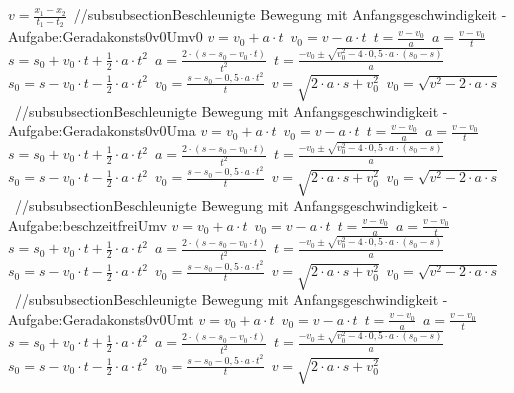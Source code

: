 $ v = \frac{x_{1}  - x_{2} }{t_{1}  - t_{2} } $\ 
//subsubsection{Beschleunigte Bewegung mit Anfangsgeschwindigkeit - Aufgabe:Geradakonsts0v0Umv0} 
$ v = v_{0}  + a\cdot t $\ 
$ v_{0}  = v - a\cdot t $\ 
$ t = \frac{v - v_{0} }{a} $\ 
$ a = \frac{v - v_{0} }{  t} $\ 
$ s = s_{0}  + v_{0} \cdot t + \frac{1}{2}\cdot a\cdot t^{2} $\ 
$ a = \frac{2\cdot (s - s_{0}  - v_{0} \cdot t)}{     t^{2} } $\ 
$ t = \frac{-v_{0}  \pm \sqrt{v_{0} ^{2} -4\cdot 0,5\cdot a\cdot (s_{0}  -s)}}{       a} $\ 
$ s_{0}  = s - v_{0} \cdot t - \frac{1}{2}\cdot a\cdot t^{2} $\ 
$ v_{0}  =\frac{s-s_{0} -0,5\cdot a\cdot t^{2} }{    t} $\ 
$ v  =\sqrt{2\cdot a \cdot s+ v_{0}^2} $\ 
$ v_{0}  =\sqrt{v^2-2\cdot a \cdot s} $\ 
//subsubsection{Beschleunigte Bewegung mit Anfangsgeschwindigkeit - Aufgabe:Geradakonsts0v0Uma} 
$ v = v_{0}  + a\cdot t $\ 
$ v_{0}  = v - a\cdot t $\ 
$ t = \frac{v - v_{0} }{a} $\ 
$ a = \frac{v - v_{0} }{  t} $\ 
$ s = s_{0}  + v_{0} \cdot t + \frac{1}{2}\cdot a\cdot t^{2} $\ 
$ a = \frac{2\cdot (s - s_{0}  - v_{0} \cdot t)}{     t^{2} } $\ 
$ t = \frac{-v_{0}  \pm \sqrt{v_{0} ^{2} -4\cdot 0,5\cdot a\cdot (s_{0}  -s)}}{       a} $\ 
$ s_{0}  = s - v_{0} \cdot t - \frac{1}{2}\cdot a\cdot t^{2} $\ 
$ v_{0}  =\frac{s-s_{0} -0,5\cdot a\cdot t^{2} }{    t} $\ 
$ v  =\sqrt{2\cdot a \cdot s+ v_{0}^2} $\ 
$ v_{0}  =\sqrt{v^2-2\cdot a \cdot s} $\ 
//subsubsection{Beschleunigte Bewegung mit Anfangsgeschwindigkeit - Aufgabe:beschzeitfreiUmv} 
$ v = v_{0}  + a\cdot t $\ 
$ v_{0}  = v - a\cdot t $\ 
$ t = \frac{v - v_{0} }{a} $\ 
$ a = \frac{v - v_{0} }{  t} $\ 
$ s = s_{0}  + v_{0} \cdot t + \frac{1}{2}\cdot a\cdot t^{2} $\ 
$ a = \frac{2\cdot (s - s_{0}  - v_{0} \cdot t)}{     t^{2} } $\ 
$ t = \frac{-v_{0}  \pm \sqrt{v_{0} ^{2} -4\cdot 0,5\cdot a\cdot (s_{0}  -s)}}{       a} $\ 
$ s_{0}  = s - v_{0} \cdot t - \frac{1}{2}\cdot a\cdot t^{2} $\ 
$ v_{0}  =\frac{s-s_{0} -0,5\cdot a\cdot t^{2} }{    t} $\ 
$ v  =\sqrt{2\cdot a \cdot s+ v_{0}^2} $\ 
$ v_{0}  =\sqrt{v^2-2\cdot a \cdot s} $\ 
//subsubsection{Beschleunigte Bewegung mit Anfangsgeschwindigkeit - Aufgabe:Geradakonsts0v0Umt} 
$ v = v_{0}  + a\cdot t $\ 
$ v_{0}  = v - a\cdot t $\ 
$ t = \frac{v - v_{0} }{a} $\ 
$ a = \frac{v - v_{0} }{  t} $\ 
$ s = s_{0}  + v_{0} \cdot t + \frac{1}{2}\cdot a\cdot t^{2} $\ 
$ a = \frac{2\cdot (s - s_{0}  - v_{0} \cdot t)}{     t^{2} } $\ 
$ t = \frac{-v_{0}  \pm \sqrt{v_{0} ^{2} -4\cdot 0,5\cdot a\cdot (s_{0}  -s)}}{       a} $\ 
$ s_{0}  = s - v_{0} \cdot t - \frac{1}{2}\cdot a\cdot t^{2} $\ 
$ v_{0}  =\frac{s-s_{0} -0,5\cdot a\cdot t^{2} }{    t} $\ 
$ v  =\sqrt{2\cdot a \cdot s+ v_{0}^2} $\ 
